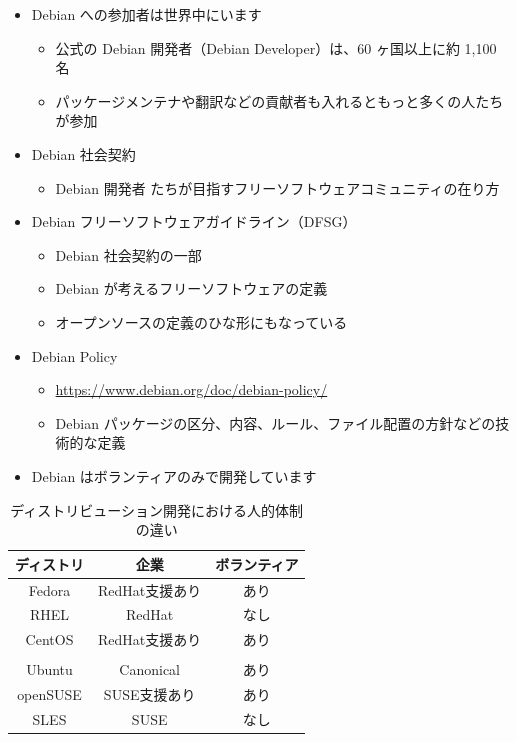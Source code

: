 \documentclass[mingoth,a4paper]{jsarticle}
\begin{document}
\begin{itemize}
\item Debian への参加者は世界中にいます
  \begin{itemize}
  \item 公式の Debian 開発者（Debian Developer）は、60 ヶ国以上に約 1,100 名
  \item パッケージメンテナや翻訳などの貢献者も入れるともっと多くの人たちが参加
  \end{itemize}
\end{itemize}


\begin{itemize}
\item Debian 社会契約
  \begin{itemize}
  \item Debian 開発者 たちが目指すフリーソフトウェアコミュニティの在り方
  \end{itemize}
\item Debian フリーソフトウェアガイドライン（DFSG）
  \begin{itemize}
  \item Debian 社会契約の一部
  \item Debian が考えるフリーソフトウェアの定義
  \item オープンソースの定義のひな形にもなっている
  \end{itemize}
\item Debian Policy
  \begin{itemize}
  \item \url{https://www.debian.org/doc/debian-policy/}
  \item Debian パッケージの区分、内容、ルール、ファイル配置の方針などの技術的な定義
  \end{itemize}
\end{itemize}


\begin{itemize}
\item Debian はボランティアのみで開発しています
\end{itemize}

\begin{table}[htb]
  \caption {ディストリビューション開発における人的体制の違い}
  \begin{center}
  \begin{tabular}{|c|c|c|}
    \hline
    ディストリ & 企業 & ボランティア \\ \hline
    Fedora & RedHat支援あり & あり  \\ \hline
    RHEL & RedHat & なし  \\ \hline
    CentOS & RedHat支援あり & あり \\ \hline
    \color{red}{Debian}  & \color{red}{なし} & \color{red}{あり} \\ \hline
    Ubuntu  & Canonical & あり \\ \hline
    openSUSE & SUSE支援あり & あり \\ \hline
    SLES & SUSE & なし \\ \hline
  \end{tabular}
  \end{center}
\end{table}
\end{document}
